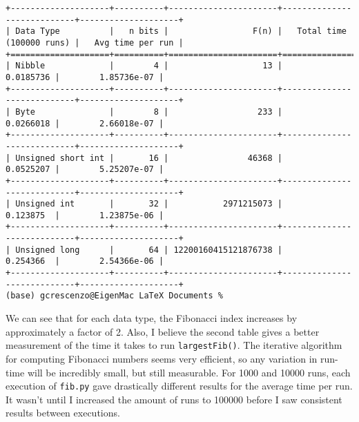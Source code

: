 \documentclass[11pt,twoside,openany]{memoir}
\begin{document}
\begin{enumerate}[label = (\roman*),itemsep=1pt,topsep=3pt]
\begin{tcolorbox}
\begin{Verbatim}[fontsize=\tiny]
+--------------------+----------+----------------------+----------------------------+--------------------+
| Data Type          |   n bits |                 F(n) |   Total time (100000 runs) |   Avg time per run |
+====================+==========+======================+============================+====================+
| Nibble             |        4 |                   13 |                  0.0185736 |        1.85736e-07 |
+--------------------+----------+----------------------+----------------------------+--------------------+
| Byte               |        8 |                  233 |                  0.0266018 |        2.66018e-07 |
+--------------------+----------+----------------------+----------------------------+--------------------+
| Unsigned short int |       16 |                46368 |                  0.0525207 |        5.25207e-07 |
+--------------------+----------+----------------------+----------------------------+--------------------+
| Unsigned int       |       32 |           2971215073 |                  0.123875  |        1.23875e-06 |
+--------------------+----------+----------------------+----------------------------+--------------------+
| Unsigned long      |       64 | 12200160415121876738 |                  0.254366  |        2.54366e-06 |
+--------------------+----------+----------------------+----------------------------+--------------------+
(base) gcrescenzo@EigenMac LaTeX Documents % 
\end{Verbatim}
\end{tcolorbox}
    We can see that for each data type, the Fibonacci index increases by approximately a factor of 2. Also, I believe the second table gives a better measurement of the time it takes to run \texttt{largestFib()}. The iterative algorithm for computing Fibonacci numbers seems very efficient, so any variation in run-time will be incredibly small, but still measurable. For 1000 and 10000 runs, each execution of \texttt{fib.py} gave drastically different results for the average time per run. It wasn't until I increased the amount of runs to 100000 before I saw consistent results between executions.


\end{enumerate}
\end{document}
